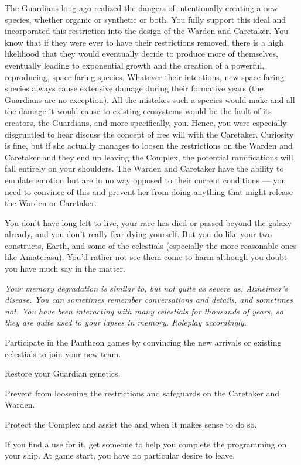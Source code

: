 \documentclass[char]{guardians}
\begin{document}
The Guardians long ago realized the dangers of intentionally creating a new species, whether organic or synthetic or both. You fully support this ideal and incorporated this restriction into the design of the Warden and Caretaker. You know that if they were ever to have their restrictions removed, there is a high likelihood that they would eventually decide to produce more of themselves, eventually leading to exponential growth and the creation of a powerful, reproducing, space-faring species. Whatever their intentions, new space-faring species always cause extensive damage during their formative years (the Guardians are no exception). All the mistakes such a species would make and all the damage it would cause to existing ecosystems would be the fault of its creators, the Guardians, and more specifically, you. Hence, you were especially disgruntled to hear \cKachiko{} discuss the concept of free will with the Caretaker. Curiosity is fine, but if she actually manages to loosen the restrictions on the Warden and Caretaker and they end up leaving the Complex, the potential ramifications will fall entirely on your shoulders. The Warden and Caretaker have the ability to emulate emotion but are in no way opposed to their current conditions --- you need to convince \cKachiko{} of this and prevent her from doing anything that might release the Warden or Caretaker.

You don't have long left to live, your race has died or passed beyond the galaxy already, and you don't really fear dying yourself. But you do like your two constructs, Earth, and some of the celestials (especially the more reasonable ones like Amaterasu). You'd rather not see them come to harm although you doubt you have much say in the matter.

\emph{Your memory degradation is similar to, but not quite as severe as, Alzheimer's disease. You can sometimes remember conversations and details, and sometimes not. You have been interacting with many celestials for thousands of years, so they are quite used to your lapses in memory. Roleplay accordingly.}

\begin{itemz}[Goals]
  \item Participate in the Pantheon games by convincing the new arrivals or existing celestials to join your new team.
  \item Restore your Guardian genetics.
  \item Prevent \cKachiko{} from loosening the restrictions and safeguards on the Caretaker and Warden.
  \item Protect the Complex and assist the \cWarden{} and \cCaretaker{} when it makes sense to do so.
  \item If you find a use for it, get someone to help you complete the programming on your ship. At game start, you have no particular desire to leave.
\end{itemz}
\end{document}
